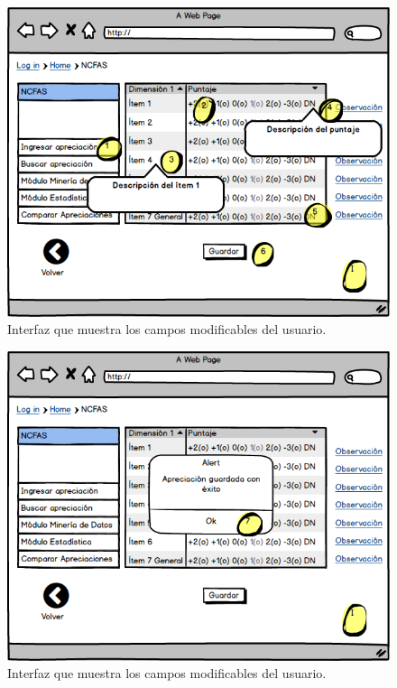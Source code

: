 \begin{figure}[h!]
	\label{ncfas3}
	\begin{center}
		\includegraphics[scale=0.3]{imagenes/ncfas3.png}
	\end{center}
	\caption{Interfaz que muestra los campos modificables del usuario.}
\end{figure}

\begin{figure}[h!]
	\label{ncfas4}
	\begin{center}
		\includegraphics[scale=0.3]{imagenes/ncfas4.png}
	\end{center}
	\caption{Interfaz que muestra los campos modificables del usuario.}
\end{figure}


